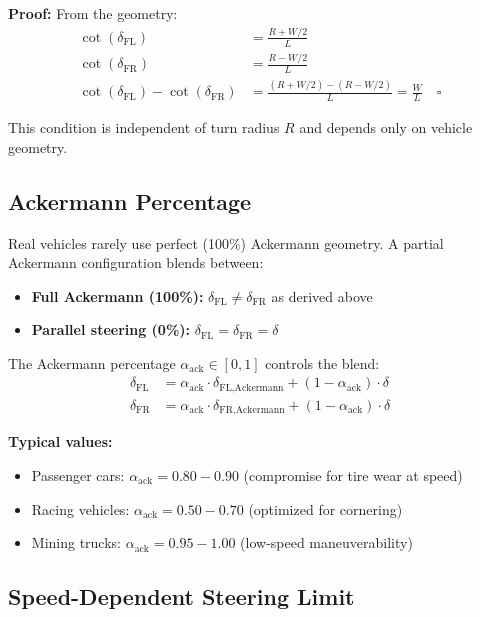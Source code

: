 \documentclass[11pt,a4paper]{article}
\begin{document}
\textbf{Proof:} From the geometry:
\begin{align}
\cot(\delta_{\text{FL}}) &= \frac{R + W/2}{L} \\
\cot(\delta_{\text{FR}}) &= \frac{R - W/2}{L} \\
\cot(\delta_{\text{FL}}) - \cot(\delta_{\text{FR}}) &= \frac{(R + W/2) - (R - W/2)}{L} = \frac{W}{L} \quad \square
\end{align}

This condition is independent of turn radius $R$ and depends only on vehicle geometry.

\subsection{Ackermann Percentage}

Real vehicles rarely use perfect (100\%) Ackermann geometry. A partial Ackermann configuration blends between:
\begin{itemize}
    \item \textbf{Full Ackermann (100\%):} $\delta_{\text{FL}} \neq \delta_{\text{FR}}$ as derived above
    \item \textbf{Parallel steering (0\%):} $\delta_{\text{FL}} = \delta_{\text{FR}} = \delta$
\end{itemize}

The Ackermann percentage $\alpha_{\text{ack}} \in [0, 1]$ controls the blend:
\begin{align}
\delta_{\text{FL}} &= \alpha_{\text{ack}} \cdot \delta_{\text{FL,Ackermann}} + (1 - \alpha_{\text{ack}}) \cdot \delta \\
\delta_{\text{FR}} &= \alpha_{\text{ack}} \cdot \delta_{\text{FR,Ackermann}} + (1 - \alpha_{\text{ack}}) \cdot \delta
\end{align}

\textbf{Typical values:}
\begin{itemize}
    \item Passenger cars: $\alpha_{\text{ack}} = 0.80 - 0.90$ (compromise for tire wear at speed)
    \item Racing vehicles: $\alpha_{\text{ack}} = 0.50 - 0.70$ (optimized for cornering)
    \item Mining trucks: $\alpha_{\text{ack}} = 0.95 - 1.00$ (low-speed maneuverability)
\end{itemize}

\subsection{Speed-Dependent Steering Limit}
\end{document}
